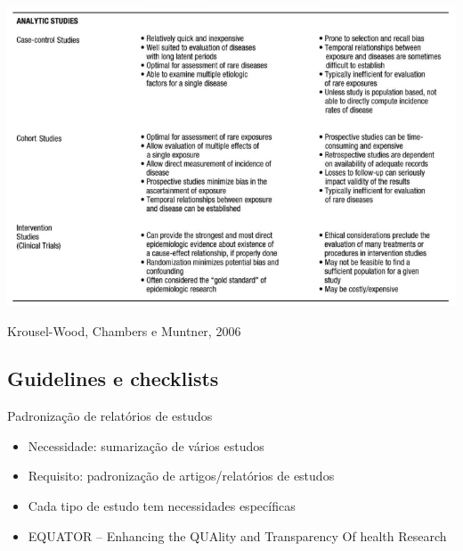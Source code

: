 \documentclass{beamer}
\begin{document}
\begin{frame}{}
  \begin{center}
    \includegraphics[width=\textwidth]{Metodos/estudos-resumo2}
  \end{center}

  \vfill
  \tiny
  \hfill Krousel-Wood, Chambers e Muntner, 2006
\end{frame}

\subsection{Guidelines e checklists}

\begin{frame}{Padronização de relatórios de estudos}
  \begin{itemize}
    \small
  \item Necessidade: sumarização de vários estudos
  \bigskip
  \item Requisito: padronização de artigos/relatórios de estudos
    \bigskip
  \item Cada tipo de estudo tem necessidades específicas
    \bigskip
    \footnotesize
  \item EQUATOR -- {\scriptsize Enhancing the QUAlity and Transparency Of health Research}
  \end{itemize}
\end{frame}
\end{document}
